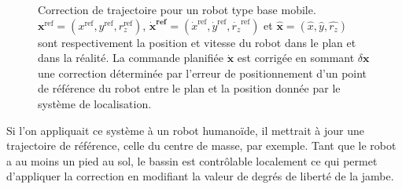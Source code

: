 \begin{figure}[ht!]
  \begin{center}
  \end{center}
  \caption{Correction de trajectoire pour un robot type base
    mobile. $\mathbf{x}^{\text{ref}} = (x^{\text{ref}},
    y^{\text{ref}}, r_z^{\text{ref}})$, $\mathbf{\dot{x}^{\text{ref}}}
    = (\dot{x}^{\text{ref}}, \dot{y}^{\text{ref}},
    \dot{r_z}^{\text{ref}})$ et $\mathbf{\hat{x}} = (\hat{x}, \hat{y},
    \hat{r_z})$ sont respectivement la position et vitesse du robot
    dans le plan et dans la réalité. La commande planifiée
    $\mathbf{\dot{x}}$ est corrigée en sommant $\delta \mathbf{x}$ une
    correction déterminée par l'erreur de positionnement d'un point de
    référence du robot entre le plan et la position donnée par le
    système de localisation. \label{fig:system}}
\end{figure}

Si l'on appliquait ce système à un robot humanoïde, il mettrait à jour
une trajectoire de référence, celle du centre de masse, par
exemple. Tant que le robot a au moins un pied au sol, le bassin est
contrôlable localement ce qui permet d'appliquer la correction en
modifiant la valeur de degrés de liberté de la jambe.


